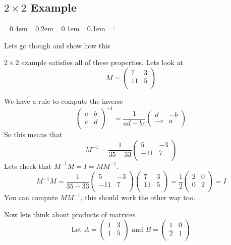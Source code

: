  
\subsection*{$2\times2$ Example}

{\ttfamily
{}\font=0.4em
\font=0.2em
\font=0.1em
\font=0.1em
\hyphenchar\font=`\-


\hypertarget{scripts_inverse_matrix_2by2_example}{Lets go though and show how this} $2 \times 2$ example satisfies all of these properties. Lets look at 
\[
M =
\left( \begin{array}{cc}
7 & 3  \\
11 & 5 \\
\end{array} \right)
\]

We have a rule to compute the inverse
\[
\left( \begin{array}{cc}
a & b  \\
c & d \\
\end{array} \right)^{-1}
=
\frac{1}{ad-bc}\left( \begin{array}{cc}
d & -b  \\
-c & a \\
\end{array} \right)
\]
So this means that 
\[
M^{-1} =
\frac{1}{35-33}
\left( \begin{array}{cc}
5 & -3  \\
-11 & 7 \\
\end{array} \right)
\]
Lets check that $M^{-1}M = I = M M^{-1}$.
\[
M^{-1}M =
\frac{1}{35-33}
\left( \begin{array}{cc}
5 & -3  \\
-11 & 7 \\
\end{array} \right)
\left( \begin{array}{cc}
7 & 3  \\
11 & 5 \\
\end{array} \right)
=
\frac{1}{2}
\left( \begin{array}{cc}
2 & 0  \\
0 &2 \\
\end{array} \right)
= I
\] 
You can compute $M M^{-1}$, this should work the other way too. 

Now lets think about products of matrices
\[
\text{Let }
A =
\left( \begin{array}{cc}
1 & 3  \\
1 & 5 \\
\end{array} \right)
\text{ and }
B=
\left( \begin{array}{cc}
1 & 0  \\
2 & 1 \\
\end{array} \right)
\]

}
